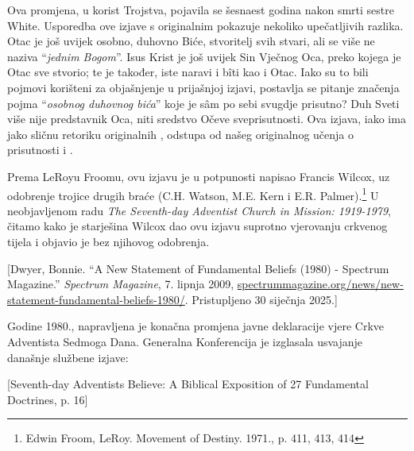 Ova promjena, u korist Trojstva, pojavila se šesnaest godina nakon smrti sestre White. Usporedba ove izjave s originalnim  pokazuje nekoliko upečatljivih razlika. Otac je još uvijek osobno, duhovno Biće, stvoritelj svih stvari, ali se više ne naziva “\textit{jednim Bogom}”. Isus Krist je još uvijek Sin Vječnog Oca, preko kojega je Otac sve stvorio; te je također, iste naravi i bîti kao i Otac. Iako su to bili pojmovi korišteni za objašnjenje  u prijašnjoj izjavi, postavlja se pitanje značenja pojma “\textit{osobnog duhovnog bića}” koje je sâm po sebi svugdje prisutno? Duh Sveti više nije predstavnik Oca, niti sredstvo Očeve sveprisutnosti. Ova izjava, iako ima jako sličnu retoriku originalnih , odstupa od našeg originalnog učenja o prisutnosti i .

Prema LeRoyu Froomu, ovu izjavu je u potpunosti napisao Francis Wilcox, uz odobrenje trojice drugih braće (C.H. Watson, M.E. Kern i E.R. Palmer).\footnote{Edwin Froom, LeRoy. Movement of Destiny. 1971., p. 411, 413, 414} U neobjavljenom radu \textit{The Seventh-day Adventist Church in Mission: 1919-1979}, čitamo kako je starješina Wilcox dao ovu izjavu suprotno vjerovanju crkvenog tijela i objavio je bez njihovog odobrenja.

[Dwyer, Bonnie. “A New Statement of Fundamental Beliefs (1980) - Spectrum Magazine.” \textit{Spectrum Magazine}, 7. lipnja 2009, \href{https://spectrummagazine.org/news/new-statement-fundamental-beliefs-1980/}{spectrummagazine.org/news/new-statement-fundamental-beliefs-1980/}. Pristupljeno 30 siječnja 2025.]

Godine 1980., napravljena je konačna promjena javne deklaracije vjere Crkve Adventista Sedmoga Dana. Generalna Konferencija je izglasala usvajanje današnje službene izjave:

[Seventh-day Adventists Believe: A Biblical Exposition of 27 Fundamental Doctrines, p. 16]

